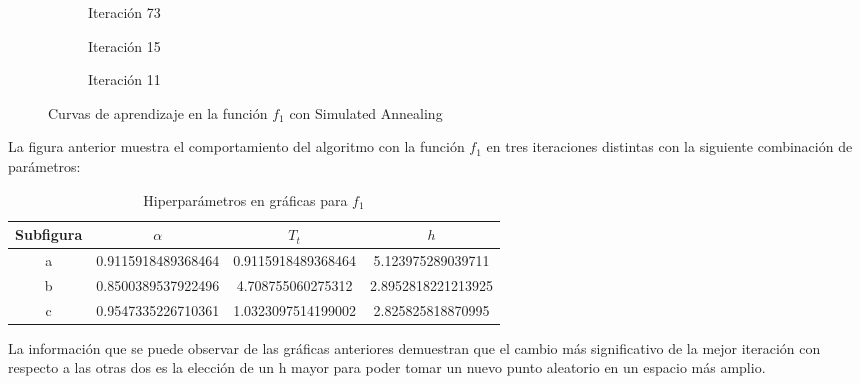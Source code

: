 \begin{figure}[h!]
     \centering
     \begin{subfigure}[b]{0.45\textwidth}
         \centering
         
         \caption{Iteración 73}
         \label{fig:learning-Simulated-Annealing-f0-72}
     \end{subfigure}
     \hfill
     \begin{subfigure}[b]{0.45\textwidth}
         \centering
         
         \caption{Iteración 15}
         \label{fig:learning-Simulated-Annealing-f0-}
     \end{subfigure}
     \hfill
     \begin{subfigure}[b]{0.45\textwidth}
         \centering
         
         \caption{Iteración 11}
         \label{fig:learning-vanilla-f0-7}
     \end{subfigure}
        \caption{Curvas de aprendizaje en la función $f_1$ con Simulated Annealing}
        \label{fig:learning-curves-f0}
\end{figure}

La figura anterior muestra el comportamiento del algoritmo con la función $f_1$ en tres iteraciones distintas con la siguiente combinación de parámetros:  


\begin{table}[H]
    \centering
    \caption{Hiperparámetros en gráficas para $f_1$}
    \begin{tabular}{|c|c|c|c|}
    \hline
    \textbf{Subfigura} & \textbf{$\alpha$} & \textbf{$T_t$} & \textbf{$h$}\\
    \hline
    a &  0.9115918489368464 & 0.9115918489368464 & 5.123975289039711\\
    \hline
    b & 0.8500389537922496 & 4.708755060275312 & 2.8952818221213925 \\
    \hline
    c & 0.9547335226710361 & 1.0323097514199002 & 2.825825818870995 \\
    \hline
    \end{tabular}
    \label{tab:hiper_simul_f1}
\end{table}

La información que se puede observar de las gráficas anteriores demuestran que el cambio más significativo de la mejor iteración con respecto a las otras dos es la elección de un h mayor para poder tomar un nuevo punto aleatorio en un espacio más amplio.

